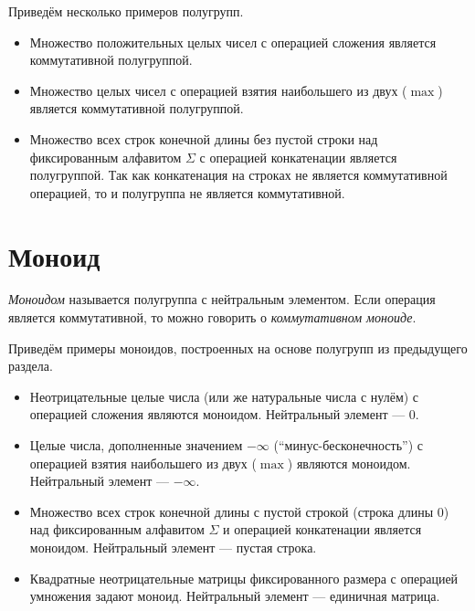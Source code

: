 \begin{example} Приведём несколько примеров полугрупп.
	\begin{itemize}
		\item Множество положительных целых чисел с операцией сложения является коммутативной полугруппой.
		\item Множество целых чисел с операцией взятия наибольшего из двух ($\max$) является коммутативной полугруппой.
		\item Множество всех строк конечной длины без пустой строки над фиксированным алфавитом $\Sigma$ с операцией конкатенации является полугруппой. Так как конкатенация на строках не является коммутативной операцией, то и полугруппа не является коммутативной.
	\end{itemize}
\end{example}


\section{Моноид}


\begin{definition}
	\emph{Моноидом} называется полугруппа с нейтральным элементом. Если операция является коммутативной, то можно говорить о \emph{коммутативном моноиде}.
\end{definition}

\begin{example} Приведём примеры моноидов, построенных на основе полугрупп из предыдущего раздела.

	\begin{itemize}
		\item Неотрицательные целые числа (или же натуральные числа с нулём) с операцией сложения являются моноидом. Нейтральный элемент --- $0$.
		\item Целые числа, дополненные значением $-\infty$ (``минус-бесконечность'') с операцией взятия наибольшего из двух ($\max$) являются моноидом. Нейтральный элемент --- $-\infty$.
		\item Множество всех строк конечной длины с пустой строкой (строка длины 0) над фиксированным алфавитом $\Sigma$ и операцией конкатенации является моноидом. Нейтральный элемент --- пустая строка.
		\item Квадратные неотрицательные матрицы фиксированного размера с операцией умножения задают моноид. Нейтральный элемент --- единичная матрица.
	\end{itemize}
\end{example}



